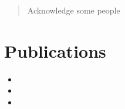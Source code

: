 \documentclass[a4paper, twoside, openright, 11pt, oldfontcommands]{memoir}
\begin{document}
\newpage

\renewcommand{\abstractname}{Acknowledgements}
\begin{abstract}
Acknowledge some people
\end{abstract}

\chapter{Publications}
\begin{itemize}
    \item {}
    \item {}
    \item {}
\end{itemize}

\clearpage

\setcounter{secnumdepth}{3}
\setcounter{tocdepth}{3}
\tableofcontents

\newpage

\mainmatter

\sloppy

















\backmatter
\cleardoublepage
\listoffigures
\listoftables
\cleardoublepage


\end{document}
